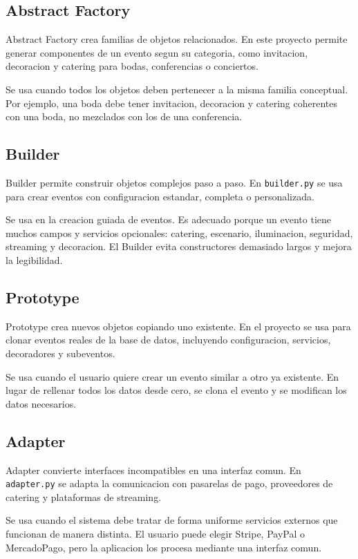 \documentclass[12pt,a4paper]{article}
\begin{document}
\subsection{Abstract Factory}

Abstract Factory crea familias de objetos relacionados. En este proyecto permite generar componentes de un evento segun su categoria, como invitacion, decoracion y catering para bodas, conferencias o conciertos.

Se usa cuando todos los objetos deben pertenecer a la misma familia conceptual. Por ejemplo, una boda debe tener invitacion, decoracion y catering coherentes con una boda, no mezclados con los de una conferencia.

\subsection{Builder}

Builder permite construir objetos complejos paso a paso. En \texttt{builder.py} se usa para crear eventos con configuracion estandar, completa o personalizada.

Se usa en la creacion guiada de eventos. Es adecuado porque un evento tiene muchos campos y servicios opcionales: catering, escenario, iluminacion, seguridad, streaming y decoracion. El Builder evita constructores demasiado largos y mejora la legibilidad.

\subsection{Prototype}

Prototype crea nuevos objetos copiando uno existente. En el proyecto se usa para clonar eventos reales de la base de datos, incluyendo configuracion, servicios, decoradores y subeventos.

Se usa cuando el usuario quiere crear un evento similar a otro ya existente. En lugar de rellenar todos los datos desde cero, se clona el evento y se modifican los datos necesarios.

\subsection{Adapter}

Adapter convierte interfaces incompatibles en una interfaz comun. En \texttt{adapter.py} se adapta la comunicacion con pasarelas de pago, proveedores de catering y plataformas de streaming.

Se usa cuando el sistema debe tratar de forma uniforme servicios externos que funcionan de manera distinta. El usuario puede elegir Stripe, PayPal o MercadoPago, pero la aplicacion los procesa mediante una interfaz comun.
\end{document}
